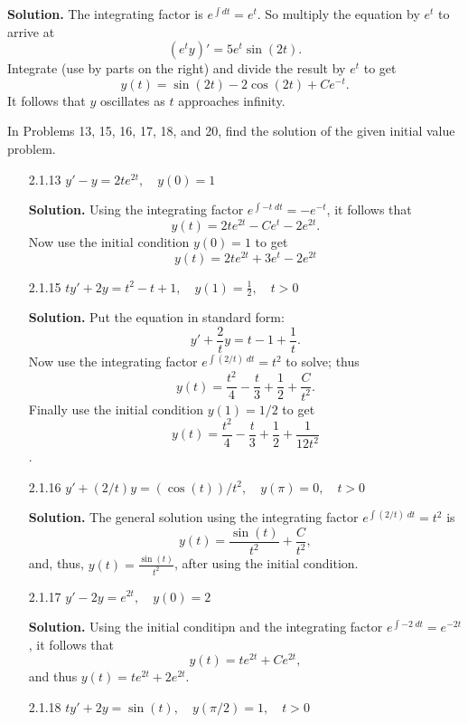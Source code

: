 \begin{enumerate}
      \textbf{Solution.} The integrating factor is $e^{\int dt} = e^t$. So
      multiply the equation by $e^t$ to arrive at
      $$(e^ty)' = 5e^t\sin(2t).$$
      Integrate (use by parts on the right) and divide the result by $e^t$ to
      get
      $$y(t) = \sin(2t) - 2\cos(2t) + Ce^{-t}.$$
      It follows that $y$ oscillates as $t$ approaches infinity.
      
\end{enumerate}

In Problems 13, 15, 16, 17, 18, and 20, find the solution of the given initial
value problem.
\begin{enumerate}
   \item[2.1.13]  $y' - y = 2te^{2t}, \quad y(0) = 1$

      \textbf{Solution.} Using the integrating factor
      $e^{\int-t\;dt} = -e^{-t}$, it follows that
      $$y(t) = 2te^{2t} - Ce^t - 2e^{2t}.$$
      Now use the initial condition $y(0) = 1$ to get
      $$y(t) = 2te^{2t} + 3e^t - 2e^{2t}$$
      
   \item[2.1.15]  $ty' + 2y = t^2 - t + 1, \quad y(1) = \frac{1}{2},
                                           \quad t > 0$

      \textbf{Solution.} Put the equation in standard form:
      $$y' + \frac{2}{t}y = t - 1 + \frac{1}{t}.$$
      Now use the integrating factor $e^{\int(2/t)\;dt} = t^2$ to solve;
      thus
      $$y(t) = \frac{t^2}{4} - \frac{t}{3} + \frac{1}{2} + \frac{C}{t^2}.$$
      Finally use the initial condition $y(1) = 1/2$ to get
      $$y(t) = \frac{t^2}{4} - \frac{t}{3} + \frac{1}{2} + \frac{1}{12t^2}$$.
   \item[2.1.16]  $y' + (2/t)y = (\cos(t))/t^2, \quad y(\pi) = 0, \quad t > 0$

      \textbf{Solution.} The general solution using the integrating factor
      $e^{\int(2/t)\;dt} = t^2$ is
      $$y(t) = \frac{\sin(t)}{t^2} + \frac{C}{t^2},$$
      and, thus, $y(t) = \frac{\sin(t)}{t^2}$, after using the initial
      condition.
   \item[2.1.17]  $y' - 2y = e^{2t}, \quad y(0) = 2$

      \textbf{Solution.} Using the initial conditipn and the
      integrating factor $e^{\int-2\;dt} = e^{-2t}$, it follows that
      $$y(t) = te^{2t} + Ce^{2t},$$
      and thus $y(t) = te^{2t} + 2e^{2t}$.
   \item[2.1.18]  $ty' + 2y = \sin(t), \quad y(\pi/2) = 1, \quad t > 0$


\end{enumerate}
